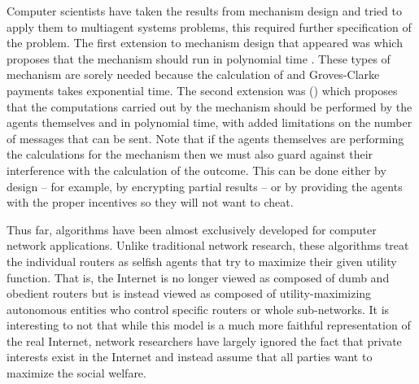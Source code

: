 Computer scientists have taken the results from mechanism design and
tried to apply them to multiagent systems problems, this required
further specification of the problem. The first extension to mechanism
design that appeared was  which
proposes that the mechanism should run in polynomial time
\cite{nisan01a}. These types of mechanism are sorely needed because
the calculation of  and Groves-Clarke payments takes
exponential time. The second extension was  () \cite{feigenbaum01a,dash03a} which
proposes that the computations carried out by the mechanism should be
performed by the agents themselves and in polynomial time, with added
limitations on the number of messages that can be sent. Note that if
the agents themselves are performing the calculations for the
mechanism then we must also guard against their interference with the
calculation of the outcome. This can be done either by design -- for
example, by encrypting partial results -- or by providing the agents
with the proper incentives so they will not want to cheat.

Thus far,  algorithms have been almost exclusively
developed for computer network applications. Unlike traditional
network research, these algorithms treat the individual routers as
selfish agents that try to maximize their given utility function. That
is, the Internet is no longer viewed as composed of dumb and obedient
routers but is instead viewed as composed of utility-maximizing
autonomous entities who control specific routers or whole sub-networks.
It is interesting to not that while this model is a much more faithful
representation of the real Internet, network researchers have largely
ignored the fact that private interests exist in the Internet and
instead assume that all parties want to maximize the social welfare.

